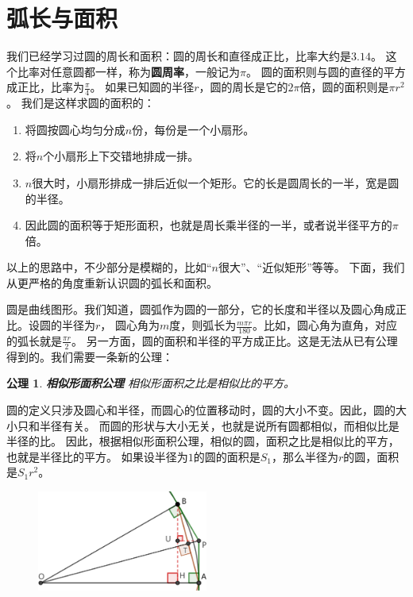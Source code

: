 \documentclass[12pt,UTF8]{ctexbook}
\newtheorem{po}{公理}
\begin{document}
\section{弧长与面积}
我们已经学习过圆的周长和面积：圆的周长和直径成正比，比率大约是$3.14$。
这个比率对任意圆都一样，称为\textbf{圆周率}，一般记为$\pi$。
圆的面积则与圆的直径的平方成正比，比率为$\frac{\pi}{4}$。
如果已知圆的半径$r$，圆的周长是它的$2\pi$倍，圆的面积则是$\pi r^2$。
我们是这样求圆的面积的：
\begin{enumerate}
    \item 将圆按圆心均匀分成$n$份，每份是一个小扇形。
    \item 将$n$个小扇形上下交错地排成一排。
    \item $n$很大时，小扇形排成一排后近似一个矩形。它的长是圆周长的一半，宽是圆的半径。
    \item 因此圆的面积等于矩形面积，也就是周长乘半径的一半，或者说半径平方的$\pi$倍。
\end{enumerate}

以上的思路中，不少部分是模糊的，比如“$n$很大”、“近似矩形”等等。
下面，我们从更严格的角度重新认识圆的弧长和面积。

圆是曲线图形。我们知道，圆弧作为圆的一部分，它的长度和半径以及圆心角成正比。设圆的半径为$r$，
圆心角为$m$度，则弧长为$\frac{m\pi r}{180}$。比如，圆心角为直角，对应的弧长就是$\frac{\pi r}{2}$。
另一方面，圆的面积和半径的平方成正比。这是无法从已有公理得到的。我们需要一条新的公理：

\begin{po}{\textbf{相似形面积公理}}
    相似形面积之比是相似比的平方。
\end{po}

圆的定义只涉及圆心和半径，而圆心的位置移动时，圆的大小不变。因此，圆的大小只和半径有关。
而圆的形状与大小无关，也就是说所有圆都相似，而相似比是半径的比。
因此，根据相似形面积公理，相似的圆，面积之比是相似比的平方，也就是半径比的平方。
如果设半径为$1$的圆的面积是$S_1$，那么半径为$r$的圆，面积是$S_1r^2$。

\begin{figure}[H] 
    \vspace{4pt}
    \centering
    \includegraphics[width=0.5\textwidth]{tu/圆面积2.png}
\end{figure}
\end{document}
